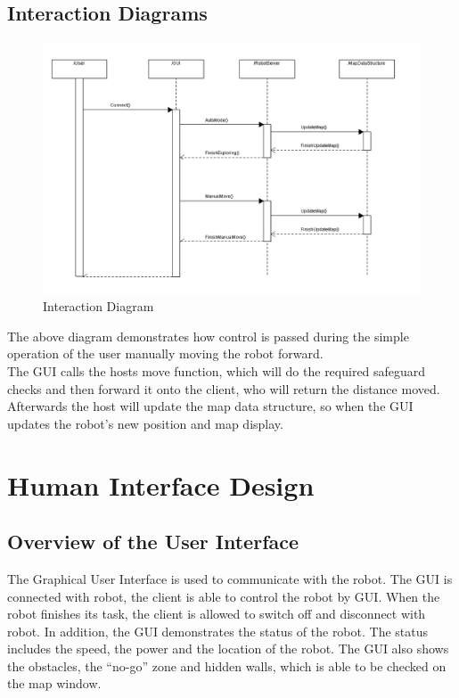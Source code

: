 \documentclass[11pt, a4paper]{report}
\begin{document}
\section{Interaction Diagrams}
\begin{figure}[h]
  \centering
    \includegraphics[width=16cm]{SEP_13_Sequence_Diagram.png}
  \caption{Interaction Diagram}
\end{figure}
The above diagram demonstrates how control is passed during the simple operation of the user manually moving the robot forward.
\\The GUI calls the hosts move function, which will do the required safeguard checks and then forward it onto the client, who will return the distance moved.
\\Afterwards the host will update the map data structure, so when the GUI updates the robot's new position and map display.

\pagebreak


\chapter{Human Interface Design}%
\label{cha:HID}

\section{Overview of the User Interface}
The Graphical User Interface is used to communicate with the robot. The GUI is connected with robot, the client is able to control the robot by GUI. When the robot finishes its task, the client is allowed to switch off and disconnect with robot. In addition, the GUI demonstrates the status of the robot. The status includes the speed, the power and the location of the robot. The GUI also shows the obstacles, the ``no-go'' zone and hidden walls, which is able to be checked on the map window.\\
\end{document}
